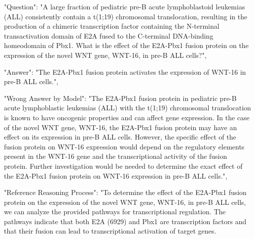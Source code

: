 \begin{tcolorbox}[breakable]

"Question": "A large fraction of pediatric pre-B acute lymphoblastoid leukemias (ALL) consistently contain a t(1;19) chromosomal translocation, resulting in the production of a chimeric transcription factor containing the N-terminal transactivation domain of E2A fused to the C-terminal DNA-binding homeodomain of Pbx1. What is the effect of the E2A-Pbx1 fusion protein on the expression of the novel WNT gene, WNT-16, in pre-B ALL cells?",

"Answer": "The E2A-Pbx1 fusion protein activates the expression of WNT-16 in pre-B ALL cells.",


"Wrong Answer by Model": "The E2A-Pbx1 fusion protein in pediatric pre-B acute lymphoblastic leukemias (ALL) with the t(1;19) chromosomal translocation is known to have oncogenic properties and can affect gene expression. In the case of the novel WNT gene, WNT-16, the E2A-Pbx1 fusion protein may have an effect on its expression in pre-B ALL cells. However, the specific effect of the fusion protein on WNT-16 expression would depend on the regulatory elements present in the WNT-16 gene and the transcriptional activity of the fusion protein. Further investigation would be needed to determine the exact effect of the E2A-Pbx1 fusion protein on WNT-16 expression in pre-B ALL cells.",



"Reference Reasoning Process": "To determine the effect of the E2A-Pbx1 fusion protein on the expression of the novel WNT gene, WNT-16, in pre-B ALL cells, we can analyze the provided pathways for transcriptional regulation. The pathways indicate that both E2A (6929) and Pbx1 are transcription factors and that their fusion can lead to transcriptional activation of target genes.


\end{tcolorbox}
